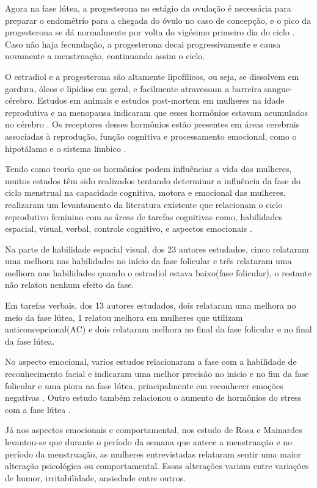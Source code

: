 Agora na fase lútea, a progesterona no estágio da ovulação é necessária para preparar o endométrio para a chegada do óvulo no caso de concepção, e o pico da progesterona se dá normalmente por volta do vigésimo primeiro dia do ciclo \cite{nikas2003}. Caso não haja fecundação, a progesterona decai progressivamente e causa novamente a menstruação, continuando assim o ciclo.

O estradiol e a progesterona são altamente lipofílicos, ou seja, se dissolvem em gordura, óleos e lipídios em geral, e facilmente atravessam a barreira sangue-cérebro. Estudos em animais e estudos post-mortem em mulheres na idade reprodutiva e na menopausa indicaram que esses hormônios estavam acumulados no cérebro \cite{bixo1997}. Os receptores desses hormônios estão presentes em áreas cerebrais associadas à reprodução, função cognitiva e processamento emocional, como o hipotálamo e o sistema límbico \cite{gruber2002, brinton2008}.

Tendo como teoria que os hormônios podem influênciar a vida das mulheres, muitos estudos têm sido realizados tentando determinar a influência da fase do ciclo menstrual na capacidade cognitiva, motora e emocional das mulheres.  realizaram um levantamento da literatura existente que relacionam o ciclo reprodutivo feminino com as áreas de tarefas cognitivas como, habilidades espacial, visual, verbal, controle cognitivo, e aspectos emocionais .

Na parte de habilidade espacial visual, dos 23 autores estudados, cinco relataram uma melhora nas habilidades no início da fase folicular e três relataram uma melhora nas habilidades quando o estradiol estava baixo(fase folicular), o restante não relatou nenhum efeito da fase.

Em tarefas verbais, dos 13 autores estudados, dois relataram uma melhora no meio da fase lútea, 1 relatou melhora em mulheres que utilizam anticoncepcional(AC) e dois relataram melhora no final da fase folicular e no final da fase lútea.

No aspecto emocional, varios estudos relacionaram a fase com a habilidade de reconhecimento facial e indicaram uma melhor precisão no inicio e no fim da fase folicular \cite{gasbarri2008} e uma piora na fase lútea, principalmente em reconhecer emoções negativas \cite{derntl2008}. Outro estudo também relacionou o aumento de hormônios do stress com a fase lútea \cite{kirschbaum1999}.

Já nos aspectos emocionais e comportamental, nos estudo de Rosa e Mainardes levantou-se que durante o período da semana que antece a menstruação e no período da menstruação, as mulheres entrevistadas relataram sentir uma maior alteração psicológica ou comportamental. Essas alterações variam entre variações de humor, irritabilidade, ansiedade entre outros.

